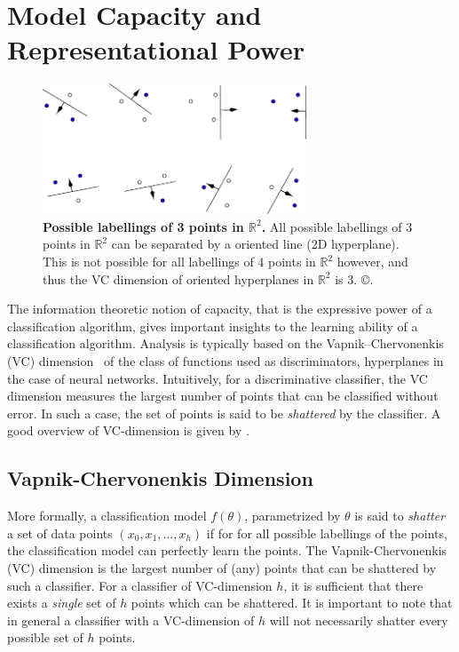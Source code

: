 \documentclass[thesis]{subfiles}
\begin{document}
    \section{Model Capacity and Representational Power}
    \begin{figure}
        \centering
        \includegraphics[width=0.7\textwidth]{Figs/PDF/vcdim_r2lines}
        \caption[Possible labellings of 3 points in $\mathbb{R}^2$. ]{\textbf{Possible labellings of 3 points in $\mathbb{R}^2$.} All possible labellings of 3 points in $\mathbb{R}^2$ can be separated by a oriented line (2D hyperplane). This is not possible for all labellings of 4 points in $\mathbb{R}^2$ however, and thus the VC dimension of oriented hyperplanes in $\mathbb{R}^2$ is 3. \copyright\citet{burges1998tutorial}.}\label{fig:vcdim_r2line}
    \end{figure}
    The information theoretic notion of capacity, that is the expressive power of a classification algorithm, gives important insights to the learning ability of a classification algorithm. Analysis is typically based on the Vapnik–Chervonenkis (VC) dimension~\citep{vapnik2015uniform} of the class of functions used as discriminators, \eg hyperplanes in the case of neural networks. Intuitively, for a discriminative classifier, the VC dimension measures the largest number of points that can be classified without error. In such a case, the set of points is said to be \emph{shattered} by the classifier. A good overview of VC-dimension is given by \citet{burges1998tutorial}.
    
    \subsection{Vapnik-Chervonenkis Dimension}
    More formally, a classification model $f(\theta)$, parametrized by $\theta$ is said to \emph{shatter} a set of data points $(x_0, x_1, \ldots, x_h)$ if for for all possible labellings of the points, the classification model can perfectly learn the points. The Vapnik-Chervonenkis (VC) dimension is the largest number of (any) points that can be shattered by such a classifier. For a classifier of VC-dimension $h$, it is sufficient that there exists a \emph{single} set of $h$ points which can be shattered. It is important to note that in general a classifier with a VC-dimension of $h$ will not necessarily shatter every possible set of $h$ points. 
    
\end{document}
